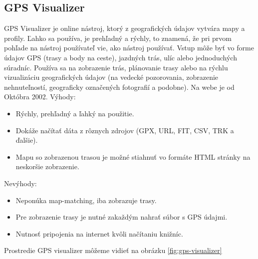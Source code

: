 \subsection{GPS Visualizer}
GPS Visualizer je online nástroj, ktorý z geografických údajov vytvára mapy a profily. Ľahko sa používa, je prehľadný a rýchly, to znamená, že pri prvom pohľade na nástroj používateľ vie, ako nástroj používať. Vstup môže byť vo forme údajov GPS (trasy a body na ceste), jazdných trás, ulíc alebo jednoduchých súradníc. Používa sa na zobrazenie trás, plánovanie trasy alebo na rýchlu vizualizáciu geografických údajov (na vedecké pozorovania, zobrazenie nehnuteľností, geograficky označených fotografií a podobne). Na webe je od Októbra 2002\cite{gps_visualizer}. Výhody:
\begin{itemize}
  \item Rýchly, prehľadný a ľahký na použitie.
  \item Dokáže načítať dáta z rôznych zdrojov (GPX, URL, FIT, CSV, TRK a ďalšie).
  \item Mapu so zobrazenou trasou je možné stiahnuť vo formáte HTML stránky na neskoršie zobrazenie.
\end{itemize}
Nevýhody:
\begin{itemize}
  \item Neponúka map-matching, iba zobrazuje trasy.
  \item Pre zobrazenie trasy je nutné zakaždým nahrať súbor s GPS údajmi.
  \item Nutnosť pripojenia na internet kvôli načítaniu knižníc.
\end{itemize}
Prostredie GPS visualizer môžeme vidieť na obrázku \ref{fig:gps-visualizer}
